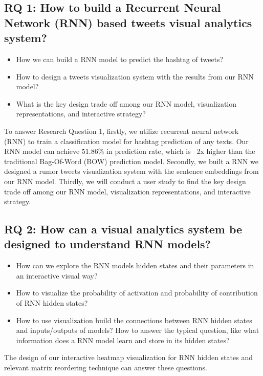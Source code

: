 \subsection{RQ 1: How to build a Recurrent Neural Network (RNN) based tweets visual analytics system?}

\begin{itemize}
    \item How we can build a RNN model to predict the hashtag of tweets?
    
    \item How to design a tweets visualization system with the results from our RNN model? 
    
    \item What is the key design trade off among our RNN model, visualization representations, and interactive strategy?
\end{itemize}

To answer Research Question 1,  firstly, we utilize recurrent neural network (RNN) to train a classification model for hashtag prediction of any texts. Our RNN model can achieve $51.86\%$ in prediction rate, which is ~2x higher than the traditional Bag-Of-Word (BOW) prediction model. Secondly, we built a RNN we designed a rumor tweets visualization system with the sentence embeddings from our RNN model. Thirdly, we will conduct a user study to find the key design trade off among our RNN model, visualization representations, and interactive strategy.

\subsection{RQ 2: How can a visual analytics system be designed to understand RNN models? }
 
 
\begin{itemize}
    \item How can we explore the RNN models hidden states and their parameters in an interactive visual way?
    \item How to visualize the probability of activation and probability of contribution of RNN hidden states? 
    \item How to use visualization build the connections between RNN hidden states and inputs/outputs of models? How to answer the typical question, like what information does a RNN model learn and store in its hidden states?
\end{itemize}


The design of our interactive heatmap visualization for RNN hidden states and relevant matrix reordering technique can answer these questions. 


